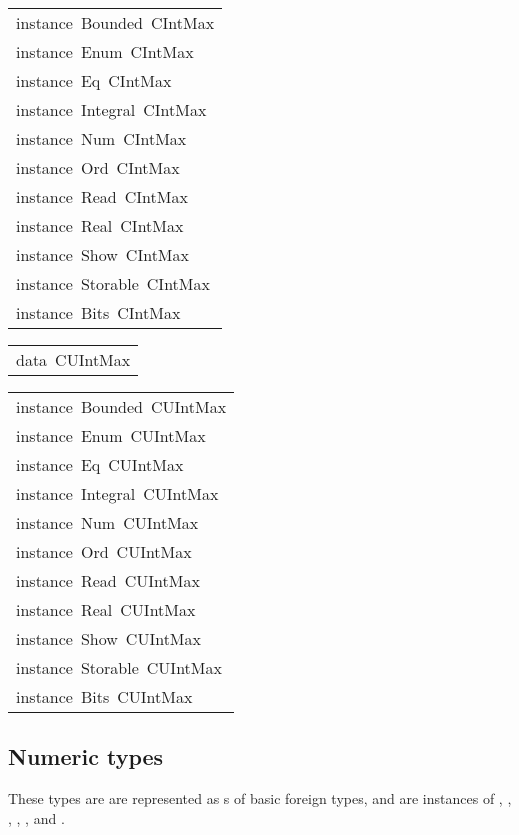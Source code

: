 \begin{haddockdesc}
\item[\begin{tabular}{@{}l}
instance\ Bounded\ CIntMax\\instance\ Enum\ CIntMax\\instance\ Eq\ CIntMax\\instance\ Integral\ CIntMax\\instance\ Num\ CIntMax\\instance\ Ord\ CIntMax\\instance\ Read\ CIntMax\\instance\ Real\ CIntMax\\instance\ Show\ CIntMax\\instance\ Storable\ CIntMax\\instance\ Bits\ CIntMax
\end{tabular}]
\end{haddockdesc}
\begin{haddockdesc}
\item[\begin{tabular}{@{}l}
data\ CUIntMax
\end{tabular}]
\end{haddockdesc}
\begin{haddockdesc}
\item[\begin{tabular}{@{}l}
instance\ Bounded\ CUIntMax\\instance\ Enum\ CUIntMax\\instance\ Eq\ CUIntMax\\instance\ Integral\ CUIntMax\\instance\ Num\ CUIntMax\\instance\ Ord\ CUIntMax\\instance\ Read\ CUIntMax\\instance\ Real\ CUIntMax\\instance\ Show\ CUIntMax\\instance\ Storable\ CUIntMax\\instance\ Bits\ CUIntMax
\end{tabular}]
\end{haddockdesc}
\subsection{Numeric types
}
These types are are represented as s of basic
 foreign types, and are instances of
 , , , ,
 ,  and .
\par

